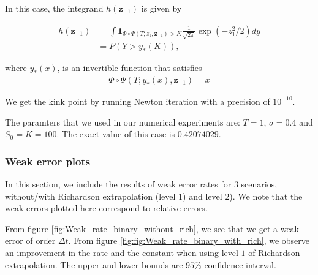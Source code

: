 \documentclass[11pt]{article}
\begin{document}
In this case, the integrand $h(\mathbf{z}_{-1})$ is given by

\begin{align}\label{smoothed_integrand_binary_opt_2}
	h(\mathbf{z}_{-1})&= \int \mathbf{1}_{\Phi \circ \Psi(T;z_1,\mathbf{z}_{-1})>K}\frac{1}{\sqrt{2 \pi}} \operatorname{exp} (-z_1^2/2) dy \nonumber\\
	&=  P(Y>y_{\ast}(K)) ,
\end{align}
 
where  $y_{\ast}(x)$, is an invertible function that satisfies 
\begin{align}
	\Phi \circ \Psi (T;y_{\ast}(x),\mathbf{z}_{-1})=x	
\end{align}

We get the kink point by running Newton iteration with a precision of $10^{-10}$.

The paramters that we used in our numerical experiments are: $T=1$, $\sigma=0.4$ and $S_0=K=100$. The exact value of this case is $0.42074029$.

\subsubsection{Weak error plots} \label{sec:Weak error plots_binary}
In this section, we include the results of weak error rates for $3$ scenarios, without/with Richardson extrapolation (level $1$) and level $2$). We note that the weak errors plotted here correspond to relative errors. 

From figure \ref{fig:Weak_rate_binary_without_rich}, we see that we get a weak error of order $\Delta t$. From figure \ref{fig:fig:Weak_rate_binary_with_rich}, we observe an improvement in the rate and the constant when using level $1$ of Richardson extrapolation. The upper and lower bounds are $95\%$ confidence interval.
\end{document}
